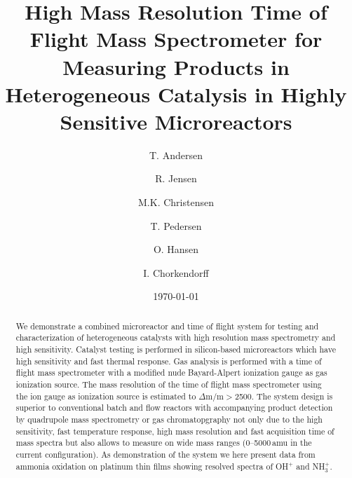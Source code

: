 \documentclass[aip,rsi]{revtex4-1}
\begin{document}

\title{High Mass Resolution Time of Flight Mass Spectrometer for Measuring Products in Heterogeneous Catalysis in Highly Sensitive Microreactors} %



\author{T. Andersen}
\author{R. Jensen}
\author{M.K. Christensen}
\author{T. Pedersen}
\author{O. Hansen}
\author{I. Chorkendorff}


\date{\today}

\begin{abstract}
We demonstrate a combined microreactor and time of flight system for testing and characterization of heterogeneous catalysts with high resolution mass spectrometry and high sensitivity. Catalyst testing is performed in silicon-based microreactors which have high sensitivity and fast thermal response. Gas analysis is performed with a time of flight mass spectrometer with a modified nude Bayard-Alpert ionization gauge as gas ionization source. The mass resolution of the time of flight mass spectrometer using the ion gauge as ionization source is estimated to $\Delta$m/m$>$2500. The system design is superior to conventional batch and flow reactors with accompanying product detection by quadrupole mass spectrometry or gas chromatopgraphy not only due to the high sensitivity, fast temperature response, high mass resolution and fast acquisition time of mass spectra but also allows to measure on wide mass ranges (0--5000\,amu in the current configuration). As demonstration of the system we here present data from ammonia oxidation on platinum thin films showing resolved spectra of OH$^{+}$ and NH$_{3}^{+}$.
\end{abstract}
\end{document}
